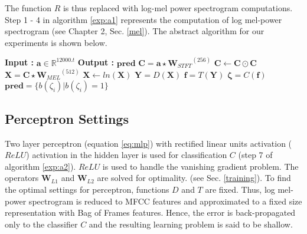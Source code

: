 \noindent The function $R$ is thus replaced with log-mel power spectrogram computations. Step 1 - 4 in algorithm \ref{exp:a1} represents the computation of log mel-power spectrogram (see Chapter 2, Sec. \ref{mel}). The abstract algorithm for our experiments is shown below.  
\begin{algorithm}
  \caption{$\textbf{pred}$ = $Model$($\textbf{a}$) }\label{exp:a1}
  \begin{algorithmic}[1]
    \Statex \textbf{Input :} $\textbf{a} \in \mathbb{R}^{12000.t}$
    \Statex \textbf{Output :} $\textbf{pred}$ 
    \State $\textbf{C} = \textbf{a} \star {\textbf{W}_{STFT}}^{(256)}$ 
    \State $\textbf{C} \leftarrow \textbf{C} \odot \textbf{C}$
    \State $\textbf{X} = \textbf{C} \star {\textbf{W}_{MEL}}^{(512)}$ 
    \State $\textbf{X} \leftarrow ln(\textbf{X})$
    \State $\textbf{Y} = D(\textbf{X})$ 
    \State $\textbf{f} = T(\textbf{Y})$ 
    \State $\bm{\zeta} = C(\textbf{f})$ 
    \State $\textbf{pred} = \{ b(\zeta_{i}) | b(\zeta_{i}) = 1 \}$ 
  \end{algorithmic}
\end{algorithm}
\FloatBarrier

\subsection{Perceptron Settings}
\label{percentron_s}
Two layer perceptron (equation \ref{eq:mlp}) with rectified linear units activation ($ReLU$) activation in the hidden layer is used for classification $C$ (step 7 of algorithm \ref{exp:a2}). $ReLU$ is used to handle the vanishing gradient problem. The operators $\textbf{W}_{L1}$ and $\textbf{W}_{L2}$ are solved for optimality. (see Sec. \ref{training}). To find the optimal settings for perceptron, functions $D$ and $T$ are fixed. Thus, log mel-power spectrogram is reduced to MFCC features and approximated to a fixed size representation with Bag of Frames features. Hence, the error is back-propagated only to the classifier $C$ and the resulting learning problem is said to be shallow.  

